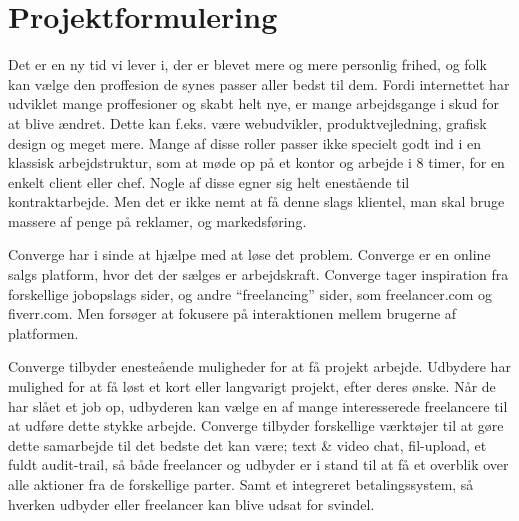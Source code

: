 \chapter{Projektformulering} %
\label{cha:Projektformulering}

Det er en ny tid vi lever i, der er blevet mere og mere personlig frihed, og folk kan vælge den proffesion de synes passer aller bedst til dem. Fordi internettet har udviklet mange proffesioner og skabt helt nye, er mange arbejdsgange i skud for at blive ændret. Dette kan f.eks. være webudvikler, produktvejledning, grafisk design og meget mere. Mange af disse roller passer ikke specielt godt ind i en klassisk arbejdstruktur, som at møde op på et kontor og arbejde i 8 timer, for en enkelt client eller chef. Nogle af disse egner sig helt enestående til kontraktarbejde. Men det er ikke nemt at få denne slags klientel, man skal bruge massere af penge på reklamer, og markedsføring.

Converge har i sinde at hjælpe med at løse det problem. Converge er en online salgs platform, hvor det der sælges er arbejdskraft. Converge tager inspiration fra forskellige jobopslags sider, og andre ``freelancing'' sider, som freelancer.com og fiverr.com. Men forsøger at fokusere på interaktionen mellem brugerne af platformen.

Converge tilbyder enesteående muligheder for at få projekt arbejde. Udbydere har mulighed for at få løst et kort eller langvarigt projekt, efter deres ønske. Når de har slået et job op, udbyderen kan vælge en af mange interesserede freelancere til at udføre dette stykke arbejde. Converge tilbyder forskellige værktøjer til at gøre dette samarbejde til det bedste det kan være; text \& video chat, fil-upload, et fuldt audit-trail, så både freelancer og udbyder er i stand til at få et overblik over alle aktioner fra de forskellige parter. Samt et integreret betalingssystem, så hverken udbyder eller freelancer kan blive udsat for svindel. 

